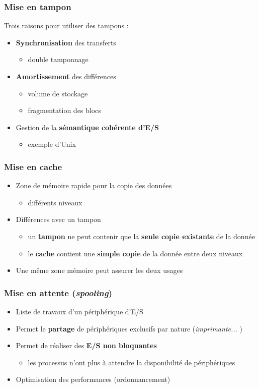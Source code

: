 \begin{frame}
\frametitle{Mise en tampon}
Trois raisons pour utiliser des tampons :
\begin{itemize}
\item \textbf{Synchronisation} des transferts
\begin{itemize}
\item double tamponnage
\end{itemize}
\item \textbf{Amortissement} des différences 
\begin{itemize}
\item volume de stockage
\item fragmentation des blocs
\end{itemize}
\item Gestion de la \textbf{sémantique cohérente d'E/S}
\begin{itemize}
\item exemple d'Unix
\end{itemize}
\end{itemize}
\end{frame}

\begin{frame}
\frametitle{Mise en cache}
\begin{itemize}
\item Zone de mémoire rapide pour la copie des données
\begin{itemize}
\item différents niveaux
\end{itemize}
\item Différences avec un tampon 
\begin{itemize}
\item un \textbf{tampon} ne peut contenir que la \textbf{seule copie existante} de la donnée
\item le \textbf{cache} contient une \textbf{simple copie} de la donnée entre deux niveaux
\end{itemize}
\item Une même zone mémoire peut assurer les deux usages
\end{itemize}
\end{frame}

\begin{frame}
\frametitle{Mise en attente (\textit{spooling})}
\begin{itemize}
\item Liste de travaux d'un périphérique d'E/S
\item Permet le \textbf{partage} de périphériques exclusifs par nature (\textit{imprimante... })
\item Permet de réaliser des \textbf{E/S non bloquantes}
\begin{itemize}
\item les processus n'ont plus à attendre la disponibilité de périphériques
\end{itemize}

\item Optimisation des performances (ordonnancement)
\end{itemize}
\end{frame}


